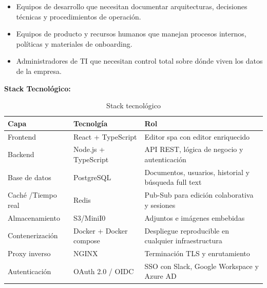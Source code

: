 \documentclass{report}
\begin{document}
\begin{itemize}
    \item Equipos de desarrollo que necesitan documentar arquitecturas, decisiones técnicas y procedimientos de operación.
    \item Equipos de producto y recursos humanos que manejan procesos internos, políticas y materiales de onboarding. 
    \item Administradores de TI que necesitan control total sobre dónde viven los datos de la empresa. 
\end{itemize}
\newpage
\textbf{Stack Tecnológico: }
\begin{table}[h]
\centering
\begin{tabular}{|p{3cm}|p{5.5cm}|p{5.5cm}|}
\hline
\textbf{Capa} & \textbf{Tecnolgía} & \textbf{Rol} \\
\hline
Frontend & React + TypeScript & Editor spa con editor enriquecido \\
\hline
Backend & Node.js + TypeScript & API REST, lógica de negocio y autenticación \\
\hline
Base de datos & PostgreSQL & Documentos, usuarios, historial y búsqueda full text\\
\hline
Caché /Tiempo real & Redis & Pub-Sub para edición colaborativa y sesiones \\
\hline
Almacenamiento & S3/MiniI0 & Adjuntos e imágenes embebidas \\
\hline
Contenerización  & Docker + Docker compose & Despliegue reproducible en cualquier infraestructura \\
\hline
Proxy inverso & NGINX & Terminación TLS y enrutamiento \\
\hline
Autenticación & OAuth 2.0 / OIDC & SSO con Slack, Google Workspace y Azure AD \\
\hline
\end{tabular} 
\caption{Stack tecnológico}
\label{tab:comparativa}
\end{table}
\end{document}
